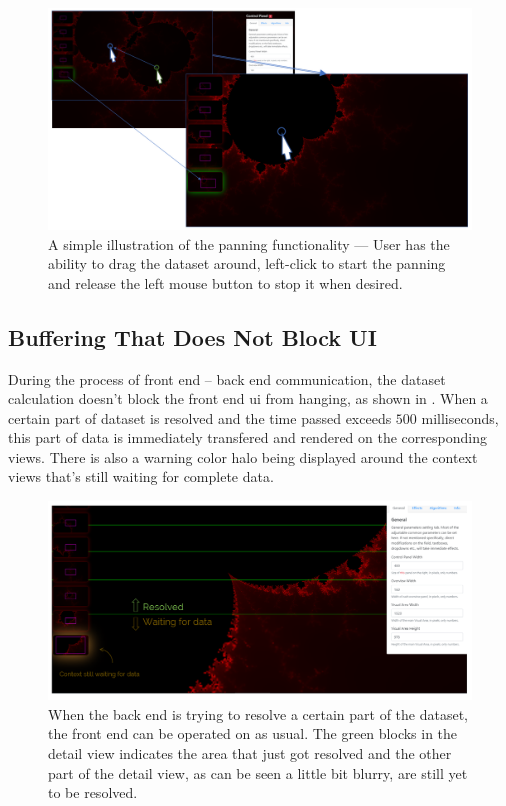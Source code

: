 \begin{figure}[H]
\centering
\includegraphics[width=\textwidth,keepaspectratio]{Figures/Chapter5/panning.png}
\decoRule
\caption[Panning Functionality]{A simple illustration of the panning functionality --- User has the ability to drag the dataset around, left-click to start the panning and release the left mouse button to stop it when desired.}
\label{fig:chap5:panning}
\end{figure}

\subsection{Buffering That Does Not Block UI}

During the process of front end -- back end communication, the dataset calculation doesn't block the front end \gls{ui} from hanging, as shown in . When a certain part of dataset is resolved and the time passed exceeds $500$ milliseconds, this part of data is immediately transfered and rendered on the corresponding views. There is also a warning color halo being displayed around the context views that's still waiting for complete data.

\begin{figure}[H]
\centering
\includegraphics[width=\textwidth,keepaspectratio]{Figures/Chapter5/buffer.png}
\decoRule
\caption[Data Resolving Buffering]{When the back end is trying to resolve a certain part of the dataset, the front end can be operated on as usual. The green blocks in the detail view indicates the area that just got resolved and the other part of the detail view, as can be seen a little bit blurry, are still yet to be resolved.}
\label{fig:chap5:buffer}
\end{figure}

